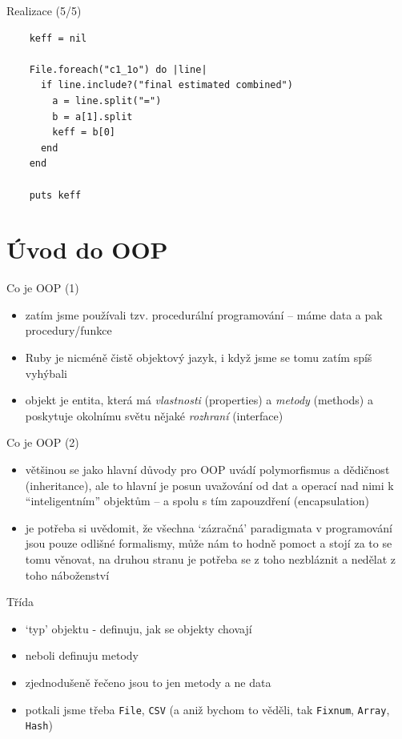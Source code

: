 \documentclass{beamer}
\begin{document}
\begin{frame}[fragile]{Realizace (5/5)}
  \scriptsize
  \begin{verbatim}
    keff = nil

    File.foreach("c1_1o") do |line|
      if line.include?("final estimated combined")
        a = line.split("=")
        b = a[1].split
        keff = b[0]
      end
    end

    puts keff
  \end{verbatim}
\end{frame}


\section{Úvod do OOP}

\begin{frame}{Co je OOP (1)}
  \begin{itemize}
    \item zatím jsme používali tzv. procedurální programování – máme data a pak procedury/funkce
    \item Ruby je nicméně čistě objektový jazyk, i když jsme se tomu zatím spíš vyhýbali
    \item objekt je entita, která má \emph{vlastnosti} (properties) a \emph{metody} (methods) a poskytuje okolnímu světu nějaké \emph{rozhraní} (interface)
  \end{itemize}
\end{frame}

\begin{frame}{Co je OOP (2)}
  \begin{itemize}
    \item většinou se jako hlavní důvody pro OOP uvádí polymorfismus a dědičnost (inheritance), ale to hlavní je posun uvažování od dat a operací nad nimi k ``inteligentním'' objektům – a spolu s tím zapouzdření (encapsulation)
    \item je potřeba si uvědomit, že všechna `zázračná' paradigmata v programování jsou pouze odlišné formalismy, může nám to hodně pomoct a stojí za to se tomu věnovat, na druhou stranu je potřeba se z toho nezbláznit a nedělat z toho náboženství
  \end{itemize}
\end{frame}

\begin{frame}{Třída}
  \begin{itemize}
    \item `typ' objektu - definuju, jak se objekty chovají
    \item neboli definuju metody
    \item zjednodušeně řečeno jsou to jen metody a ne data
    \item potkali jsme třeba \texttt{File}, \texttt{CSV} (a aniž bychom to věděli, tak \texttt{Fixnum}, \texttt{Array}, \texttt{Hash})
  \end{itemize}
\end{frame}
\end{document}
